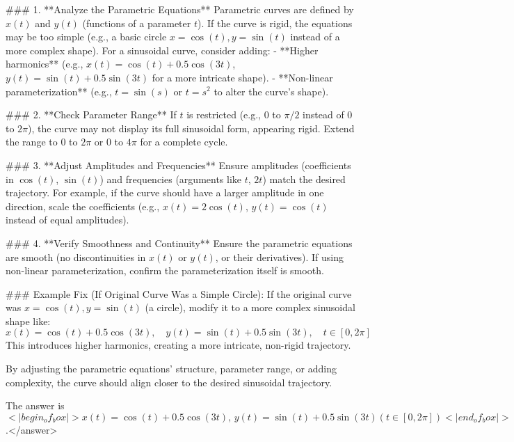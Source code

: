 ### 1. **Analyze the Parametric Equations**  
Parametric curves are defined by \( x(t) \) and \( y(t) \) (functions of a parameter \( t \)). If the curve is rigid, the equations may be too simple (e.g., a basic circle \( x = \cos(t), y = \sin(t) \) instead of a more complex shape). For a sinusoidal curve, consider adding:  
- **Higher harmonics** (e.g., \( x(t) = \cos(t) + 0.5\cos(3t) \), \( y(t) = \sin(t) + 0.5\sin(3t) \) for a more intricate shape).  
- **Non-linear parameterization** (e.g., \( t = \sin(s) \) or \( t = s^2 \) to alter the curve’s shape).  

### 2. **Check Parameter Range**  
If \( t \) is restricted (e.g., \( 0 \) to \( \pi/2 \) instead of \( 0 \) to \( 2\pi \)), the curve may not display its full sinusoidal form, appearing rigid. Extend the range to \( 0 \) to \( 2\pi \) or \( 0 \) to \( 4\pi \) for a complete cycle.  

### 3. **Adjust Amplitudes and Frequencies**  
Ensure amplitudes (coefficients in \( \cos(t) \), \( \sin(t) \)) and frequencies (arguments like \( t \), \( 2t \)) match the desired trajectory. For example, if the curve should have a larger amplitude in one direction, scale the coefficients (e.g., \( x(t) = 2\cos(t) \), \( y(t) = \cos(t) \) instead of equal amplitudes).  

### 4. **Verify Smoothness and Continuity**  
Ensure the parametric equations are smooth (no discontinuities in \( x(t) \) or \( y(t) \), or their derivatives). If using non-linear parameterization, confirm the parameterization itself is smooth.  

### Example Fix (If Original Curve Was a Simple Circle):  
If the original curve was \( x = \cos(t), y = \sin(t) \) (a circle), modify it to a more complex sinusoidal shape like:  
\[
x(t) = \cos(t) + 0.5\cos(3t), \quad y(t) = \sin(t) + 0.5\sin(3t), \quad t \in [0, 2\pi]
\]  
This introduces higher harmonics, creating a more intricate, non-rigid trajectory.  

By adjusting the parametric equations’ structure, parameter range, or adding complexity, the curve should align closer to the desired sinusoidal trajectory.  

The answer is \(<|begin_of_box|>x(t) = \cos(t) + 0.5\cos(3t), \, y(t) = \sin(t) + 0.5\sin(3t) (t \in [0, 2\pi])<|end_of_box|>\).</answer>